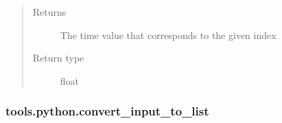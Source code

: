 \documentclass[letterpaper,10pt,english]{sphinxmanual}
\begin{document}
\begin{fulllineitems}
\begin{quote}
\begin{description}
\begin{itemize}
\end{itemize}

\item[{Returns}] \leavevmode
\sphinxAtStartPar
{} \textendash{} The time value that corresponds to the given index

\item[{Return type}] \leavevmode
\sphinxAtStartPar
float

\end{description}\end{quote}

\end{fulllineitems}



\subsubsection{tools.python.convert\_input\_to\_list}
\label{\detokenize{_autosummary/tools.python.convert_input_to_list:tools-python-convert-input-to-list}}\label{\detokenize{_autosummary/tools.python.convert_input_to_list::doc}}
\end{document}
